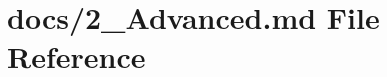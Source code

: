 \hypertarget{2___advanced_8md}{}\section{docs/2\+\_\+\+Advanced.md File Reference}
\label{2___advanced_8md}
